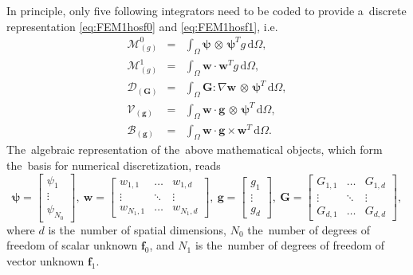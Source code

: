 \documentclass[preprint,12pt]{elsarticle}
\newcommand{\vect}[1]{\boldsymbol{#1}}
\newcommand{\matr}[1]{\mathbf{#1}}
\newcommand{\dI}{\text{d}}
\newcommand{\vfzero}{\vect{f}_0}
\newcommand{\fone}{\vect{f}_1}
\newcommand{\intO}{\int_{\Omega}}
\newcommand{\IM}{\boldsymbol{\mathcal{M}}}
\newcommand{\ID}{\boldsymbol{\mathcal{D}}}
\newcommand{\IV}{\boldsymbol{\mathcal{V}}}
\newcommand{\IB}{\boldsymbol{\mathcal{B}}}
\newcommand{\Wzero}{\psi}
\newcommand{\Wone}{\matr{w}}
\newcounter{bla}
\begin{document}
In principle, only five following integrators need to be coded to provide
a~discrete representation \eqref{eq:FEM1hosf0} and \eqref{eq:FEM1hosf1}, i.e.
\begin{eqnarray}
  \IM^0_{(g)} &=& \intO\vect{\Wzero}\, \otimes\, \vect{\Wzero}^T g\, \dI \Omega ,
  \label{eq:IM0}\\
  \IM^1_{(g)} &=& \intO\Wone \cdot \Wone^T g\, \dI\Omega ,
  \label{eq:IM1}\\
  \ID_{(\matr{G})} &=& \intO \matr{G} : \nabla\Wone
  \, \otimes\, \vect{\Wzero}^T\, \dI \Omega ,
  \label{eq:ID}\\
  \IV_{(\vect{g})} &=& \intO\Wone \cdot
  \vect{g}\, \otimes\, \vect{\Wzero}^T\, \dI \Omega ,
  \label{eq:IV}\\
  \IB_{(\vect{g})} &=& \intO\Wone \cdot
  \vect{g} \times \Wone^T\, \dI \Omega .
  \label{eq:IB}
\end{eqnarray}
The~algebraic representation of the~above mathematical objects, which
form the~basis for numerical discretization, reads 
\begin{equation}
  \vect{\Wzero} = \begin{bmatrix}
    \Wzero_{1} \\
	\vdots   \\
	\Wzero_{N_0}
  \end{bmatrix},~
  \Wone = \begin{bmatrix}
    w_{1, 1} & \hdots & w_{1, d} \\
	\vdots   & \ddots & \vdots \\
	w_{N_1, 1} & \hdots & w_{N_1, d}
  \end{bmatrix},~
  \vect{g} = \begin{bmatrix}
    g_{1} \\
	\vdots   \\
	g_{d}
  \end{bmatrix},~
  \matr{G} = \begin{bmatrix}
    G_{1, 1} & \hdots & G_{1, d} \\
	\vdots   & \ddots & \vdots \\
	G_{d, 1} & \hdots & G_{d, d}
  \end{bmatrix},
\end{equation}
where $d$ is the~number of spatial dimensions, $N_0$ the~number of
degrees of freedom of scalar unknown $\vfzero$, and $N_1$ is the~number
of degrees of freedom of vector unknown $\fone$.
\end{document}
